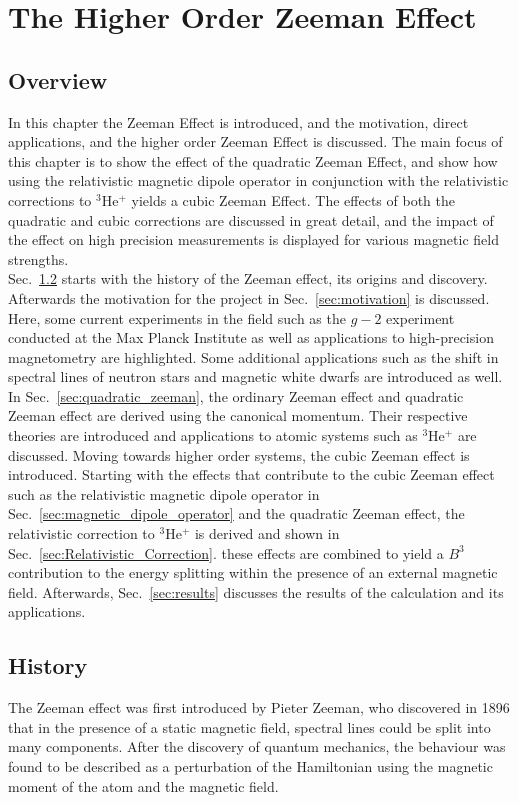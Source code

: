 \chapter{The Higher Order Zeeman Effect}\label{sec:Zeeman-Effect}
    \section{Overview}
        In this chapter the Zeeman Effect is introduced, and the motivation, direct applications, and the higher order Zeeman Effect is discussed. The main focus of this chapter is to show the effect of the quadratic Zeeman Effect, and show how using the relativistic magnetic dipole operator in conjunction with the relativistic corrections to $^3$He$^+$ yields a cubic Zeeman Effect. The effects of both the quadratic and cubic corrections are discussed in great detail, and the impact of the effect on high precision measurements is displayed for various magnetic field strengths.\\

       Sec.~\ref{sec:history} starts with the history of the Zeeman effect, its origins and discovery. Afterwards the motivation for the project in Sec.~\ref{sec:motivation} is discussed. Here, some current experiments in the field such as the $g-2$ experiment conducted at the Max Planck Institute as well as applications to high-precision magnetometry are highlighted. Some additional applications such as the shift in spectral lines of neutron stars and magnetic white dwarfs are introduced as well. In Sec.~\ref{sec:quadratic_zeeman}, the ordinary Zeeman effect and quadratic Zeeman effect are derived using the canonical momentum. Their respective theories are introduced and applications to atomic systems such as $^3$He$^+$ are discussed. Moving towards higher order systems, the cubic Zeeman effect is introduced. Starting with the effects that contribute to the cubic Zeeman effect such as the relativistic magnetic dipole operator in Sec.~\ref{sec:magnetic_dipole_operator} and the quadratic Zeeman effect, the relativistic correction to $^3$He$^+$ is derived and shown in Sec.~\ref{sec:Relativistic_Correction}. these effects are combined to yield a $B^3$ contribution to the energy splitting within the presence of an external magnetic field. Afterwards, Sec.~\ref{sec:results} discusses the results of the calculation and its applications.

    \section{History}\label{sec:history}
        The Zeeman effect was first introduced by Pieter Zeeman, who discovered in 1896 that in the presence of a static magnetic field, spectral lines could be split into many components. After the discovery of quantum mechanics, the behaviour was found to be described as a perturbation of the Hamiltonian using the magnetic moment of the atom and the magnetic field.   \\
    
